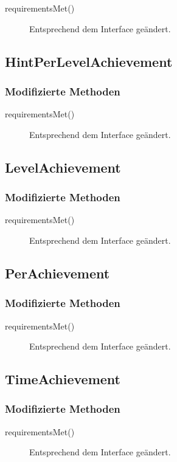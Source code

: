 \begin{description}
	\item[requirementsMet()]
	Entsprechend dem Interface geändert.
\end{description}

\subsection{HintPerLevelAchievement}

\subsubsection{Modifizierte Methoden}

\begin{description}
	\item[requirementsMet()]
	Entsprechend dem Interface geändert.
\end{description}

\subsection{LevelAchievement}

\subsubsection{Modifizierte Methoden}

\begin{description}
	\item[requirementsMet()]
	Entsprechend dem Interface geändert.
\end{description}

\subsection{PerAchievement}

\subsubsection{Modifizierte Methoden}

\begin{description}
	\item[requirementsMet()]
	Entsprechend dem Interface geändert.
\end{description}

\subsection{TimeAchievement}

\subsubsection{Modifizierte Methoden}

\begin{description}
	\item[requirementsMet()]
	Entsprechend dem Interface geändert.
\end{description}



